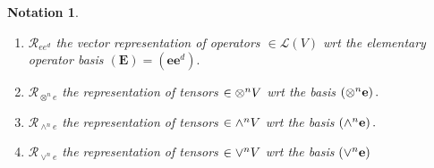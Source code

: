 \documentclass[aps,preprint]{revtex4}%
\newtheorem{notation}[theorem]{Notation}
\begin{document}
\begin{notation}
\begin{enumerate}
\begin{enumerate}
\item $\mathcal{R}_{ee^{d}}$ the \emph{vector} representation of operators
$\in\mathcal{L}\left(  V\right)  $ wrt the elementary operator basis $\left(
\mathbf{E}\right)  =\left(  \mathbf{ee}^{d}\right)  .$

\item $\mathcal{R}_{\otimes^{n}e}$ the representation of tensors
$\in{\large \otimes}^{n}V$ wrt the basis $\left(  {\large \otimes}%
^{n}\mathbf{e}\right)  .$

\item $\mathcal{R}_{\wedge^{n}e}$ the representation of tensors $\in
{\LARGE \wedge}^{n}V$ wrt the basis $\left(  {\LARGE \wedge}^{n}%
\mathbf{e}\right)  .$

\item $\mathcal{R}_{\vee^{n}e}$ the representation of tensors $\in
{\LARGE \vee}^{n}V$ wrt the basis $\left(  {\LARGE \vee}^{n}\mathbf{e}\right)
$
\end{enumerate}


\end{enumerate}
\end{notation}
\end{document}

